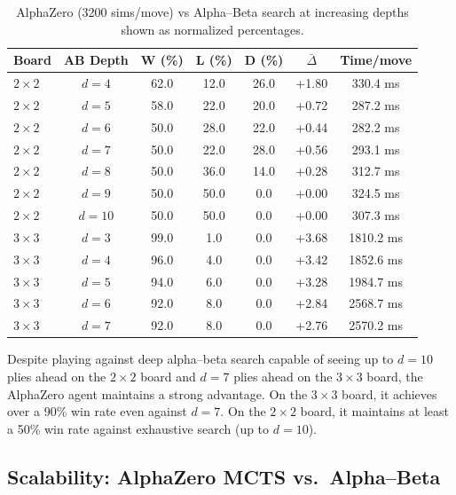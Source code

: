 \documentclass[11pt]{article}
\begin{document}
\begin{table}[H]
\centering
\caption{AlphaZero (3200 sims/move) vs Alpha--Beta search at increasing depths shown as normalized percentages.}
\label{tab:depth_analysis}
\begin{tabular}{lcccccc}
\toprule
Board & AB Depth & W (\%) & L (\%) & D (\%) & $\bar{\Delta}$ & Time/move \\
\midrule
$2{\times}2$ & $d{=}4$ & 62.0 & 12.0 & 26.0 & +1.80 & 330.4 ms \\
$2{\times}2$ & $d{=}5$ & 58.0 & 22.0 & 20.0 & +0.72 & 287.2 ms \\
$2{\times}2$ & $d{=}6$ & 50.0 & 28.0 & 22.0 & +0.44 & 282.2 ms \\
$2{\times}2$ & $d{=}7$ & 50.0 & 22.0 & 28.0 & +0.56 & 293.1 ms \\
$2{\times}2$ & $d{=}8$ & 50.0 & 36.0 & 14.0 & +0.28 & 312.7 ms \\
$2{\times}2$ & $d{=}9$ & 50.0 & 50.0 & 0.0 & +0.00 & 324.5 ms \\
$2{\times}2$ & $d{=}10$ & 50.0 & 50.0 & 0.0 & +0.00 & 307.3 ms \\
\midrule
$3{\times}3$ & $d{=}3$ & 99.0 & 1.0 & 0.0 & +3.68 & 1810.2 ms \\
$3{\times}3$ & $d{=}4$ & 96.0 & 4.0 & 0.0 & +3.42 & 1852.6 ms \\
$3{\times}3$ & $d{=}5$ & 94.0 & 6.0 & 0.0 & +3.28 & 1984.7 ms \\
$3{\times}3$ & $d{=}6$ & 92.0 & 8.0 & 0.0 & +2.84 & 2568.7 ms \\
$3{\times}3$ & $d{=}7$ & 92.0 & 8.0 & 0.0 & +2.76 & 2570.2 ms \\
\bottomrule
\end{tabular}
\end{table}

Despite playing against deep alpha--beta search capable of seeing up to $d=10$ plies ahead on the $2{\times}2$ board and $d=7$ plies ahead on the $3{\times}3$ board, the AlphaZero agent maintains a strong advantage. On the $3{\times}3$ board, it achieves over a 90\% win rate even against $d{=}7$. On the $2{\times}2$ board, it maintains at least a 50\% win rate against exhaustive search (up to $d{=}10$).

\subsection{Scalability: AlphaZero MCTS vs.\ Alpha--Beta}
\end{document}
